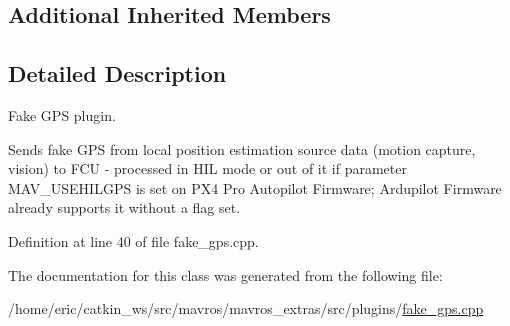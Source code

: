 \subsection*{Additional Inherited Members}


\subsection{Detailed Description}
Fake G\+PS plugin. 

Sends fake G\+PS from local position estimation source data (motion capture, vision) to F\+CU -\/ processed in H\+IL mode or out of it if parameter M\+A\+V\+\_\+\+U\+S\+E\+H\+I\+L\+G\+PS is set on P\+X4 Pro Autopilot Firmware; Ardupilot Firmware already supports it without a flag set. 

Definition at line 40 of file fake\+\_\+gps.\+cpp.



The documentation for this class was generated from the following file\+:\begin{DoxyCompactItemize}
\item 
/home/eric/catkin\+\_\+ws/src/mavros/mavros\+\_\+extras/src/plugins/\mbox{\hyperlink{fake__gps_8cpp}{fake\+\_\+gps.\+cpp}}\end{DoxyCompactItemize}
